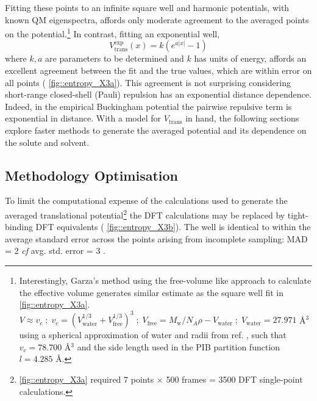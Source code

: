 \documentclass[../main.tex]{subfiles}
\begin{document}
Fitting these points to an infinite square well and harmonic potentials, with known QM eigenspectra, affords only moderate agreement to the averaged points on the potential.\footnote{Interestingly, Garza's method using the free-volume like approach to calculate the effective volume generates similar estimate as the square well fit in \figurename{ \ref{fig::entropy_X3a}}. $V \approx v_c \; ; \; v_c = (V_\text{water}^{1/3} + V_\text{free}^{1/3})^3 \; ; \; V_\text{free} = M_\text{w} / N_A \rho - V_\text{water} \; ;\; V_\text{water} = 27.971$ \AA${}^3$ using a spherical approximation of water and radii from ref. \cite{CRC}
, such that $v_c = 78.700$ \AA${}^3$ and the side length used in the PIB partition function $l = 4.285$ \AA.} In contrast, fitting an exponential well,
\begin{equation}
V_\text{trans}^\text{exp}(x) = k (e^{a|x|} - 1)
\end{equation}
where $k, a$ are parameters to be determined and $k$ has units of energy, affords an excellent agreement between the fit and the true values, which are within error on all points (\figurename{ \ref{fig::entropy_X3a}}). This agreement is not surprising considering short-range closed-shell (Pauli) repulsion has an exponential distance dependence.\cite{Bolliger2013} Indeed, in the empirical Buckingham potential %
the pairwise repulsive term is exponential in distance.\cite{Buckingham1938} With a model for $V_\text{trans}$ in hand, the following sections explore faster methods to generate the averaged potential and its dependence on the solute and solvent.

\newpage
\subsection{Methodology Optimisation}
To limit the computational expense of the calculations used to generate the averaged translational potential\footnote{\figurename{ \ref{fig::entropy_X3a}} required 7 points $\times$ 500 frames = 3500 DFT single-point calculations.} the DFT calculations may be replaced by tight-binding DFT equivalents (\figurename{ \ref{fig::entropy_X3b}}). The well is identical to within the average standard error across the points arising from incomplete sampling: MAD = 2 \kcal \emph{ cf} avg. std. error = 3 \kcal.
\end{document}
